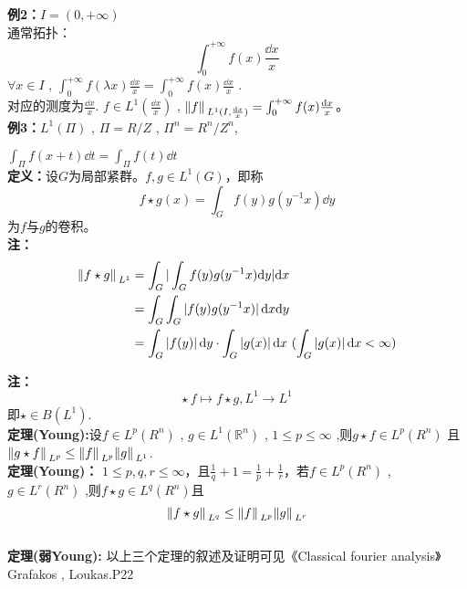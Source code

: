 {\bfseries \large 例2：}$I=(0,+\infty)$ \\
通常拓扑：
\begin{equation*}
    \int_0^{+\infty}f(x)\frac{\dd x}{x}
\end{equation*}
$\forall x\in I$ , $\int_0^{+\infty}f(\lambda x)\frac{\dd x}{x}=\int_0^{+\infty}f(x)\frac{\dd x}{x}$ . 
\\
对应的测度为$\frac{\dd x}{x}$. $f\in L^1(\frac{\dd x}{x})$ , $\norm*{f}_{L^1(I,\frac{\dd x}{x})}=\int_0^{+\infty}f(x)\frac{\dd x}{x}$。\\
{\bfseries \large 例3：}$L^1(\Pi)$ , $\Pi=R/Z$ , $\Pi^n=R^n/Z^n$,\\
$\int_{\Pi}f(x+t)\dd t=\int_{\Pi}f(t)\dd t$
\\
{\bfseries \large 定义：}设$G$为局部紧群。$f,g\in L^1(G)$，即称
\begin{equation*}
    f\star g(x)=\int_{G}f(y)g(y^{-1}x)\dd y
\end{equation*}
为$f$与$g$的卷积。
\\
{\bfseries \large 注：}
\begin{equation*}
    \begin{aligned}
        \norm*{f\star g}_{L^1}&=\int_{G}|\int_{G}f(y)g(y^{-1}x)\dd y|\dd x\\
        &=\int_{G}\int_G \abs*{f(y)g(y^{-1}x)}\dd x\dd y\\
        &=\int_G\abs*{f(y)}\dd y\cdot \int_G\abs*{g(x)}\dd x\,\,(\int_G\abs*{g(x)}\dd x<\infty)
    \end{aligned}
\end{equation*}

{\bfseries \large 注：}
\begin{equation*}
    \star\, f\mapsto f\star g, L^1\rightarrow L^1
\end{equation*}
即$\star\in B(L^1)$.
\\
{\bfseries \large 定理(Young):}设$f\in L^p(R^n)$ , $g\in L^1(\mathbb{R}^n)$ , $1\leq p\leq \infty$ ,则$g\star f\in L^p(R^n)$ 且 $\norm*{g\star f}_{L^p}\leq \norm*{f}_{L^p}\norm*{g}_{L^1}$.
\\
{\bfseries \large 定理(Young)：} $1\leq p,q,r\leq\infty$，且$\frac{1}{q}+1=\frac{1}{p}+\frac{1}{r}$，若$f\in L^p(R^n)$ , $g\in L^r(R^n)$ ,则$f\star g\in L^q(R^n)$且
\begin{equation*}
    \norm*{f\star g}_{L^q}\leq \norm*{f}_{L^p}\norm*{g}_{L^r}
\end{equation*}
\\
{\bfseries \large 定理(弱Young):}
以上三个定理的叙述及证明可见《Classical fourier analysis》 Grafakos ,  Loukas.P22